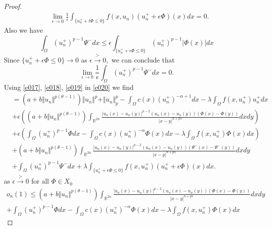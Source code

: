\documentclass[10pt,twoside,reqno,centertags,draft]{amsart}
\begin{document}
\begin{proof}
\begin{equation}
\begin{aligned}
&\lim_{\epsilon  \to 0}\frac{1}{\epsilon}\int_{\{u_n^+ +t\Phi \leq 0\}}f(x, u_n)(u_n^+ +\epsilon\Phi)(x)dx =0.
\end{aligned}
\end{equation}
Also we have 
\begin{equation*}
\int_{\Omega}(u_n^+)^{p-1}\Psi^{-}dx  \leq \epsilon \int_{\{u_n^+ +\epsilon\Phi \leq 0\}}(u_n^+)^{p-1}\vert\Phi(x)\vert dx
\end{equation*}
Since $ \{u_n^+ +\epsilon\Phi \leq 0\} \longrightarrow 0$ as $ \epsilon \xrightarrow{>} 0,$ we can conclude that 
\begin{equation}\label{e019}
\lim_{\epsilon \to 0}\frac{1}{\epsilon}\int_{\Omega}(u_n^+)^{p-1}\Psi^{-}dx =0.
\end{equation}
Using \ref{e017}, \ref{e018}, \ref{e019} in \ref{e020} we find
\footnotesize
\begin{equation*}
\begin{aligned}
& =\left( a +b\Vert u_n\Vert^{p(\theta -1)}\right)\Vert u_n\Vert^{p} +\Vert u_n\Vert^{p}_{p} -\int_{\Omega}c(x)(u_n^+)^{-\alpha +1}dx -\lambda \int_{\Omega}f(x, u_n^+)u_n^+ dx\\
& +\epsilon \left( \left( a +b\Vert u_n\Vert^{p(\theta -1)}\right)\int_{\mathbb{R}^{2n}}\frac{\vert u_n(x) -u_n(y)\vert^{p -2}(u_n(x) -u_n(y))(\Phi(x) -\Phi(y))}{\vert x -y\vert^{n +ps}}dxdy \right)\\
&+ \epsilon\left(\int_{\Omega}(u_n^+)^{p-1}\Phi dx -\int_{\Omega}c(x)(u_n^+)^{-\alpha}\Phi(x) dx -\lambda \int_{\Omega}f(x, u_n^+)\Phi(x)dx \right)\\
& +\left( a +b\Vert u_n\Vert^{p(\theta -1)}\right)\int_{\mathbb{R}^{2n}}\frac{\vert u_n(x) -u_n(y)\vert^{p -2}(u_n(x) -u_n(y))(\Psi^{-}(x) -\Psi^{-}(y))}{\vert x -y\vert^{n +ps}}dxdy \\
& +\int_{\Omega}(u_n^+)^{p-1}\Psi^{-}dx +\lambda\int_{\{u_n^+ +\epsilon\Phi \leq 0\}}f(x, u_n^+)(u_n^+ +\epsilon\Phi)(x)dx.
\end{aligned}
\end{equation*}
as $ \epsilon \xrightarrow{>} 0$ for all $ \Phi \in X_0$
\begin{equation}
\begin{split}
o_n(1) \leq \left( a +b\Vert u_n\Vert^{p(\theta -1)}\right)\int_{\mathbb{R}^{2n}}\frac{\vert u_n(x) -u_n(y)\vert^{p -2}(u_n(x) -u_n(y))(\Phi(x) -\Phi(y))}{\vert x -y\vert^{n +ps}}dxdy \\
+\int_{\Omega}(u_n^+)^{p-1}\Phi dx -\int_{\Omega}c(x)(u_n^+)^{-\alpha}\Phi(x) dx -\lambda \int_{\Omega}f(x, u_n^+)\Phi(x)dx 
\end{split}
\end{equation}
\end{proof}
\end{document}
